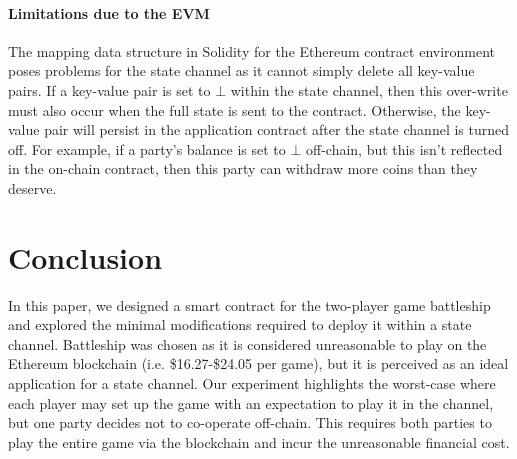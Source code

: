\documentclass{llncs}
\begin{document}
\paragraph{Limitations due to the EVM} 
The mapping data structure in Solidity for the Ethereum contract environment poses problems for the state channel as it cannot simply delete all key-value pairs.
If a key-value pair is set to $\bot$ within the state channel, then this over-write must also occur when the full state is sent to the contract. 
Otherwise, the key-value pair will persist in the application contract after the state channel is turned off.
For example, if a party's balance is set to $\bot$ off-chain, but this isn't reflected in the on-chain contract, then this party can withdraw more coins than they deserve. 

%

\section{Conclusion} 

In this paper, we designed a smart contract for the two-player game battleship and explored the minimal modifications required to deploy it within a state channel. 
Battleship was chosen as it is considered unreasonable to play on the Ethereum blockchain (i.e. \$16.27-\$24.05 per game), but it is perceived as an ideal application for a state channel. 
Our experiment highlights the worst-case where %
each player may set up the game with an expectation to play it in the channel, but one party decides not to co-operate off-chain. 
This requires both parties to play the entire game via the blockchain and incur the unreasonable financial cost.
\end{document}
